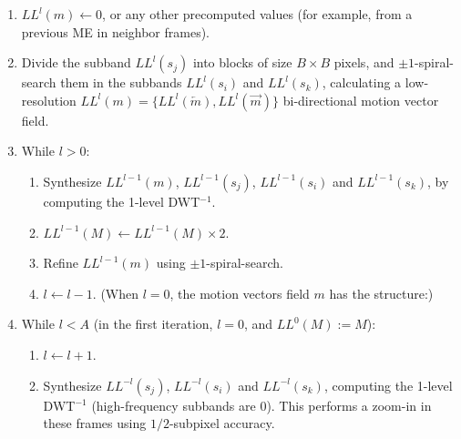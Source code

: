 {\begin{enumerate}
\item
  \(LL^l(m)\leftarrow 0\), or any other precomputed values (for example,
  from a previous ME in neighbor frames).

\item
  Divide the subband \(LL^l(s_j)\) into blocks of size \(B\times B\)
  pixels, and \(\pm 1\)-spiral-search them in the subbands \(LL^l(s_i)\)
  and \(LL^l(s_k)\), calculating a low-resolution
  \(LL^l(m)=\{LL^l(\overleftarrow{m}), LL^l(\overrightarrow{m})\}\)
  bi-directional motion vector field. 
\item
  While \(l>0\):
  
  \begin{enumerate}
    
  \item
    Synthesize \(LL^{l-1}(m)\), \(LL^{l-1}(s_j)\), \(LL^{l-1}(s_i)\)
    and \(LL^{l-1}(s_k)\), by computing the 1-level DWT\(^{-1}\).

  \item
    \(LL^{l-1}(M)\leftarrow LL^{l-1}(M)\times 2\).
  
  \item
    Refine \(LL^{l-1}(m)\) using \(\pm 1\)-spiral-search.
  
  \item
  \(l\leftarrow l-1\). (When \(l=0\), the motion vectors field \(m\)
  has the structure:)
  
  \end{enumerate}
  
  
\item
  While \(l<A\) (in the first iteration, \(l=0\), and \(LL^0(M):=M\)):
  
  \begin{enumerate}
\item
  \(l\leftarrow l+1\).

\item
  Synthesize \(LL^{-l}(s_j)\), \(LL^{-l}(s_i)\) and \(LL^{-l}(s_k)\),
  computing the 1-level DWT\(^{-1}\) (high-frequency subbands are
  \(0\)). This performs a zoom-in in these frames using \(1/2\)-subpixel
  accuracy. 


\end{enumerate}
\end{enumerate}}
